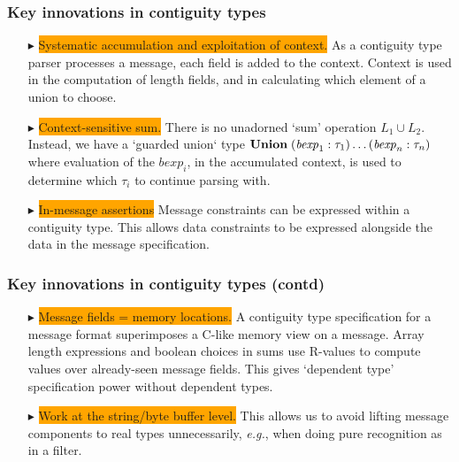 \documentclass{beamer}
\newcommand{\eg}{\textit{e.g.}}
\newcommand{\kemph}[1]{\colorbox{orange}{#1}}
\newcommand{\konst}[1]{\ensuremath{\mbox{\bf{#1}}}}
\begin{document}
\begin{frame}\frametitle{Key innovations in contiguity types}

\begin{itemize}

\item [$\blacktriangleright$] \kemph{Systematic accumulation and
  exploitation of context.} As a contiguity type parser processes a
  message, each field is added to the context. Context is
  used in the computation of length fields, and in calculating which
  element of a union to choose.

\item [$\blacktriangleright$] \kemph{Context-sensitive sum.} There is
  no unadorned `sum' operation $L_1 \cup L_2$. Instead, we have a
  `guarded union` type
  $\konst{Union}\; (\mathit{bexp}_1 : \tau_1) \ldots (\mathit{bexp}_n : \tau_n)$
  where evaluation of the $\mathit{bexp}_i$, in the accumulated
  context, is used to determine which $\tau_i$ to continue parsing
  with.

\item [$\blacktriangleright$] \kemph{In-message assertions} Message
  constraints can be expressed within a contiguity type. This allows
  data constraints to be expressed alongside the data in the message
  specification.

\end{itemize}
\end{frame}

\begin{frame}\frametitle{Key innovations in contiguity types (contd)}

\begin{itemize}

\item [$\blacktriangleright$] \kemph{Message fields = memory
  locations.}  A contiguity type specification for a message format
  superimposes a C-like memory view on a message. Array length
  expressions and boolean choices in sums use R-values to compute
  values over already-seen message fields. This gives `dependent type'
  specification power without dependent types.

\item [$\blacktriangleright$] \kemph{Work at the string/byte buffer
  level.}  This allows us to avoid lifting message components to real
  types unnecessarily, \eg, when doing pure recognition as in a
  filter.

\end{itemize}
\end{frame}
\end{document}
